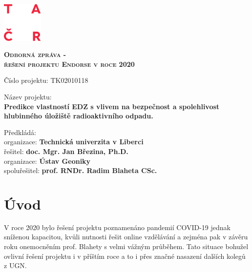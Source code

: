 \documentclass[11pt,a4paper]{article}
\begin{document}
\begin{onehalfspacing} 


\begin{titlepage}
    \includegraphics[width=2cm]{logo_TACR_zakl.pdf}

    \vspace{6cm}
    {\centering	
      {\scshape\bf\huge Odborná zpráva - \\
      řešení projektu Endorse v roce 2020\par}
    }
	
    \vspace{3cm}	
    {\LARGE
      {\noindent Číslo projektu:  TK02010118
        {\bfseries }\par}
      \vspace{2ex}
      {\noindent Název projektu: \\
        {\bfseries Predikce vlastností EDZ s vlivem na bezpečnost a spolehlivost
         hlubinného úložiště radioaktivního odpadu.} \par}
      \vspace{2ex}
      {\noindent Předkládá: \\
      \-\hspace{2ex} organizace: {\bfseries Technická univerzita v Liberci}\\
      \-\hspace{2ex} řešitel: {\bfseries doc. Mgr. Jan Březina, Ph.D.}\\
      \-\hspace{2ex} organizace: {\bfseries Ústav Geoniky}\\
      \-\hspace{2ex} spoluřešitel: {\bfseries prof. RNDr. Radim Blaheta CSc.}\par}

    }  
    \vfill
\end{titlepage}



\section{Úvod}
V roce 2020 bylo řešení projektu poznamenáno pandemií COVID-19 jednak sníženou kapacitou, kvůli nutnosti řešit online vzdělávání a zejména pak v závěru roku onemocněním prof. Blahety s velmi vážným průběhem. Tato situace bohužel 
ovlivní řešení projektu i v příštím roce a to i přes značné nasazení dalších kolegů z UGN. 


\end{onehalfspacing}
\end{document}
